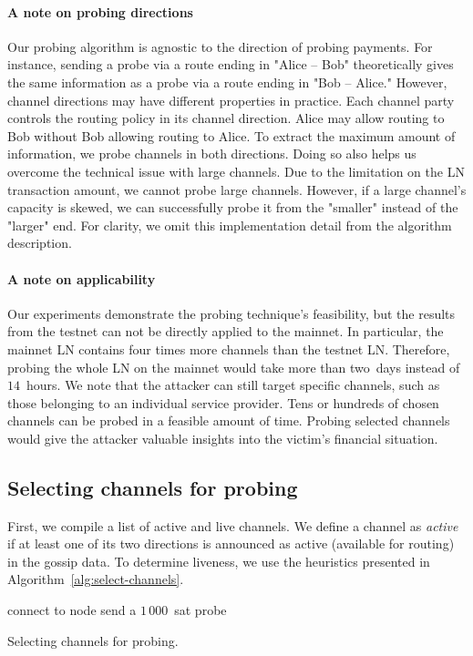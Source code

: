 \paragraph{A note on probing directions}
Our probing algorithm is agnostic to the direction of probing payments.
For instance, sending a probe via a route ending in "Alice -- Bob" theoretically gives the same information as a probe via a route ending in "Bob -- Alice."
However, channel directions may have different properties in practice.
Each channel party controls the routing policy in its channel direction.
Alice may allow routing to Bob without Bob allowing routing to Alice.
To extract the maximum amount of information, we probe channels in both directions.
Doing so also helps us overcome the technical issue with large channels.
Due to the limitation on the LN transaction amount, we cannot probe large channels.
However, if a large channel's capacity is skewed, we can successfully probe it from the "smaller" instead of the "larger" end.
For clarity, we omit this implementation detail from the algorithm description.

\paragraph{A note on applicability}
Our experiments demonstrate the probing technique's feasibility, but the results from the testnet can not be directly applied to the mainnet.
In particular, the mainnet LN contains four times more channels than the testnet LN\@.
Therefore, probing the whole LN on the mainnet would take more than two~days instead of~$14$~hours.
We note that the attacker can still target specific channels, such as those belonging to an individual service provider.
Tens or hundreds of chosen channels can be probed in a feasible amount of time.
Probing selected channels would give the attacker valuable insights into the victim's financial situation.


\subsection{Selecting channels for probing}

First, we compile a list of active and live channels.
We define a channel as \textit{active} if at least one of its two directions is announced as active (available for routing) in the gossip data.
To determine liveness, we use the heuristics presented in Algorithm~\ref{alg:select-channels}.

\begin{algorithm}
	 {
		connect to node\;
	}
	 {
		send a $1\,000$~sat probe\;
	}
	\caption{Selecting channels for probing.}
	\label{alg:select-channels}
\end{algorithm}

